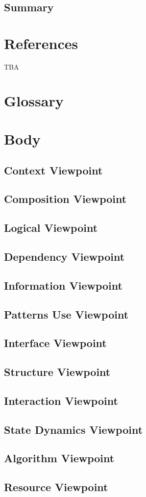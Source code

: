 \documentclass[onecolumn, draftclsnofoot,10pt, compsoc]{IEEEtran}
\begin{document}
\subsection{Summary}

\section{References}
TBA

\section{Glossary}

\section{Body}
\subsection{Context Viewpoint}
\subsection{Composition Viewpoint}
\subsection{Logical Viewpoint}
\subsection{Dependency Viewpoint}
\subsection{Information Viewpoint}
\subsection{Patterns Use Viewpoint}
\subsection{Interface Viewpoint}
\subsection{Structure Viewpoint}
\subsection{Interaction Viewpoint}
\subsection{State Dynamics Viewpoint}
\subsection{Algorithm Viewpoint}
\subsection{Resource Viewpoint}
\end{document}
